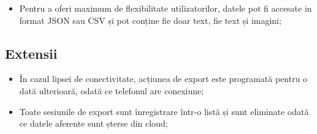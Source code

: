 \begin{itemize}
\item
  Pentru a oferi maximum de flexibilitate utilizatorilor, datele pot fi accesate in format JSON sau CSV și pot conține fie doar text, fie text și imagini;
\end{itemize}

\subsection{Extensii}\label{extensii-2}

\begin{itemize}
\item
  În cazul lipsei de conectivitate, acțiunea de export este programată pentru o dată ulterioară, odată ce telefonul are conexiune;
\item
  Toate sesiunile de export sunt înregistrare într-o listă și sunt eliminate odată ce datele aferente sunt șterse din cloud;
\end{itemize}
